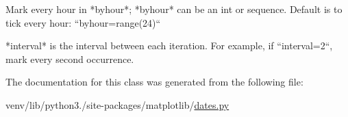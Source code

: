 \begin{DoxyVerb}Mark every hour in *byhour*; *byhour* can be an int or sequence.
Default is to tick every hour: ``byhour=range(24)``

*interval* is the interval between each iteration.  For
example, if ``interval=2``, mark every second occurrence.
\end{DoxyVerb}
 

The documentation for this class was generated from the following file\+:\begin{DoxyCompactItemize}
\item 
venv/lib/python3./site-\/packages/matplotlib/\hyperlink{dates_8py}{dates.\+py}\end{DoxyCompactItemize}
